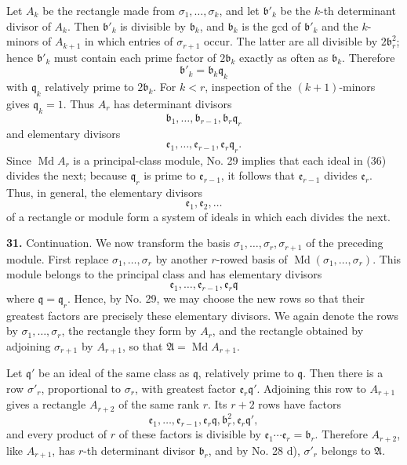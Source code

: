 \documentclass[11pt,a4paper]{article}
\begin{document}
Let \(A_k\) be the rectangle made from \(\sigma_1,\ldots,\sigma_k\), and let \(\mathfrak b'_k\) be the \(k\)-th determinant divisor of \(A_k\). Then \(\mathfrak b'_k\) is divisible by \(\mathfrak b_k\), and \(\mathfrak b_k\) is the gcd of \(\mathfrak b'_k\) and the \(k\)-minors of \(A_{k+1}\) in which entries of \(\sigma_{r+1}\) occur. The latter are all divisible by \(2\mathfrak b_r^2\); hence \(\mathfrak b'_k\) must contain each prime factor of \(2\mathfrak b_k\) exactly as often as \(\mathfrak b_k\). Therefore
\[
 \mathfrak b'_k=\mathfrak b_k\mathfrak q_k
\]
with \(\mathfrak q_k\) relatively prime to \(2\mathfrak b_k\). For \(k<r\), inspection of the \((k+1)\)-minors gives \(\mathfrak q_k=1\). Thus \(A_r\) has determinant divisors
\[
 \mathfrak b_1,\ldots,\mathfrak b_{r-1},\mathfrak b_r\mathfrak q_r
\]
and elementary divisors
\[
 \mathfrak e_1,\ldots,\mathfrak e_{r-1},\mathfrak e_r\mathfrak q_r. \tag{36}
\]
Since \(\operatorname{Md}A_r\) is a principal-class module, No. 29 implies that each ideal in (36) divides the next; because \(\mathfrak q_r\) is prime to \(\mathfrak e_{r-1}\), it follows that \(\mathfrak e_{r-1}\) divides \(\mathfrak e_r\). Thus, in general, the elementary divisors
\[
 \mathfrak e_1,\mathfrak e_2,\ldots
\]
of a rectangle or module form a system of ideals in which each divides the next.

\textbf{31.} Continuation. We now transform the basis \(\sigma_1,\ldots,\sigma_r,\sigma_{r+1}\) of the preceding module. First replace \(\sigma_1,\ldots,\sigma_r\) by another \(r\)-rowed basis of \(\operatorname{Md}(\sigma_1,\ldots,\sigma_r)\). This module belongs to the principal class and has elementary divisors
\[
 \mathfrak e_1,\ldots,\mathfrak e_{r-1},\mathfrak e_r\mathfrak q
\]
where \(\mathfrak q=\mathfrak q_r\). Hence, by No. 29, we may choose the new rows so that their greatest factors are precisely these elementary divisors. We again denote the rows by \(\sigma_1,\ldots,\sigma_r\), the rectangle they form by \(A_r\), and the rectangle obtained by adjoining \(\sigma_{r+1}\) by \(A_{r+1}\), so that \(\mathfrak A=\operatorname{Md}A_{r+1}\).

Let \(\mathfrak q'\) be an ideal of the same class as \(\mathfrak q\), relatively prime to \(\mathfrak q\). Then there is a row \(\sigma'_r\), proportional to \(\sigma_r\), with greatest factor \(\mathfrak e_r\mathfrak q'\). Adjoining this row to \(A_{r+1}\) gives a rectangle \(A_{r+2}\) of the same rank \(r\). Its \(r+2\) rows have factors
\[
 \mathfrak e_1,\ldots,\mathfrak e_{r-1},\mathfrak e_r\mathfrak q,
 \mathfrak b_r^2,\mathfrak e_r\mathfrak q',
\]
and every product of \(r\) of these factors is divisible by \(\mathfrak e_1\cdots\mathfrak e_r=\mathfrak b_r\). Therefore \(A_{r+2}\), like \(A_{r+1}\), has \(r\)-th determinant divisor \(\mathfrak b_r\), and by No. 28 d), \(\sigma'_r\) belongs to \(\mathfrak A\).
\end{document}
